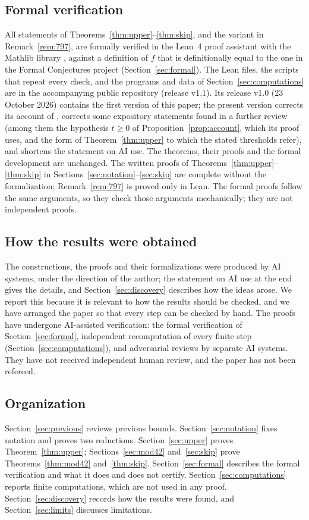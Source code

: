 \documentclass[11pt]{amsart}
\theoremstyle{remark}
\begin{document}
\subsection*{Formal verification}
All statements of Theorems~\ref{thm:upper}--\ref{thm:skip}, and the variant in Remark~\ref{rem:797}, are formally verified in the Lean~4
proof assistant \cite{Lean4} with the Mathlib library \cite{Mathlib2020}, against a definition of $f$ that is definitionally equal to the
one in the Formal Conjectures project \cite{FormalConjectures} (Section~\ref{sec:formal}). The Lean files, the scripts that
repeat every check, and the programs and data of Section~\ref{sec:computations} are in the accompanying public repository \cite{Artifact} (release v1.1). Its release v1.0 (23 October 2026)
contains the first version of this paper; the present version corrects its account of \cite{Hegyvari1986}, corrects some expository
statements found in a further review (among them the hypothesis $t\ge0$ of Proposition~\ref{prop:account}, which its proof uses, and
the form of Theorem~\ref{thm:upper} to which the stated thresholds refer), and shortens the statement on AI use. The theorems, their
proofs and the formal development are unchanged. The written proofs of
Theorems~\ref{thm:upper}--\ref{thm:skip} in Sections~\ref{sec:notation}--\ref{sec:skip} are complete without the formalization;
Remark~\ref{rem:797} is proved only in Lean. The formal proofs follow the same arguments, so they check those arguments mechanically;
they are not independent proofs.

\subsection*{How the results were obtained}
The constructions, the proofs and their formalizations were produced by AI systems, under the direction of the author; the statement on
AI use at the end gives the details, and Section~\ref{sec:discovery} describes how the ideas arose. We report this because it is relevant
to how the results should be checked, and we have arranged the paper so that every step can be checked by hand. The proofs have undergone AI-assisted verification: the
formal verification of Section~\ref{sec:formal}, independent recomputation of every finite step (Section~\ref{sec:computations}), and
adversarial reviews by separate AI systems. They have not received independent human review, and the paper has not been refereed.

\subsection*{Organization}
Section~\ref{sec:previous} reviews previous bounds. Section~\ref{sec:notation} fixes notation and proves two reductions.
Section~\ref{sec:upper} proves Theorem~\ref{thm:upper}; Sections~\ref{sec:mod42} and~\ref{sec:skip} prove Theorems~\ref{thm:mod42}
and~\ref{thm:skip}. Section~\ref{sec:formal} describes the formal verification and what it does and does not certify.
Section~\ref{sec:computations} reports finite computations, which are not used in any proof. Section~\ref{sec:discovery} records how
the results were found, and Section~\ref{sec:limits} discusses limitations.
\end{document}
